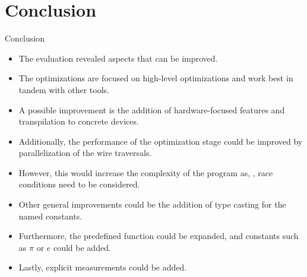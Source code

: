 
\section{Conclusion}
\begin{frame}{Conclusion}
    \begin{itemize}
        \item The evaluation revealed aspects that can be improved.
        \item The optimizations are focused on high-level optimizations and work best in tandem with other tools.
        \item A possible improvement is the addition of hardware-focused features and transpilation to concrete devices.
        \item Additionally, the performance of the optimization stage could be improved by parallelization of the wire traversals.
        \item However, this would increase the complexity of the program as, \eg, race conditions need to be considered.
        \item Other general improvements could be the addition of type casting for the named constants.
        \item Furthermore, the predefined function could be expanded, and constants such as $\pi$ or $e$ could be added.
        \item Lastly, explicit measurements could be added. 
    \end{itemize}
\end{frame}